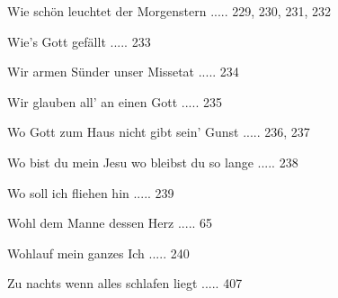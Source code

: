 \documentclass[twocolumn]{book}
\begin{document}
\newline 
Wie schön leuchtet der Morgenstern ..... 229, 230, 231, 232

\newline 
Wie's Gott gefällt ..... 233

\newline 
Wir armen Sünder unser Missetat ..... 234

\newline 
Wir glauben all' an einen Gott ..... 235

\newline 
Wo Gott zum Haus nicht gibt sein' Gunst ..... 236, 237

\newline 
Wo bist du mein Jesu wo bleibst du so lange ..... 238

\newline 
Wo soll ich fliehen hin ..... 239

\newline 
Wohl dem Manne dessen Herz ..... 65

\newline 
Wohlauf mein ganzes Ich ..... 240

\newline 
Zu nachts wenn alles schlafen liegt ..... 407
 \clearpage \onecolumn \ \thispagestyle{empty} 
\end{document}
